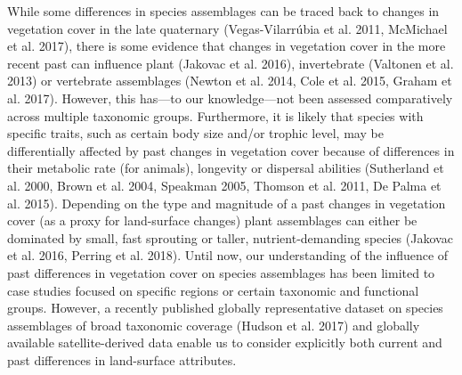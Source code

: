 {While some differences in species assemblages can be traced back to changes in vegetation cover in the late quaternary (Vegas-Vilarrúbia et al. 2011, McMichael et al. 2017), there is some evidence that changes in vegetation cover in the more recent past can influence plant (Jakovac et al. 2016), invertebrate (Valtonen et al. 2013) or vertebrate assemblages (Newton et al. 2014, Cole et al. 2015, Graham et al. 2017). However, this has—to our knowledge—not been assessed comparatively across multiple taxonomic groups. Furthermore, it is likely that species with specific traits, such as certain body size and/or trophic level, may be differentially affected by past changes in vegetation cover because of differences in their metabolic rate (for animals), longevity or dispersal abilities (Sutherland et al. 2000, Brown et al. 2004, Speakman 2005, Thomson et al. 2011, De Palma et al. 2015). Depending on the type and magnitude of a past changes in vegetation cover (as a proxy for land-surface changes) plant assemblages can either be dominated by small, fast sprouting or taller, nutrient-demanding species (Jakovac et al. 2016, Perring et al. 2018). Until now, our understanding of the influence of past differences in vegetation cover on species assemblages has been limited to case studies focused on specific regions or certain taxonomic and functional groups. However, a recently published globally representative dataset on species assemblages of broad taxonomic coverage (Hudson et al. 2017) and globally available satellite-derived data enable us to consider explicitly both current and past differences in land-surface attributes.

}
